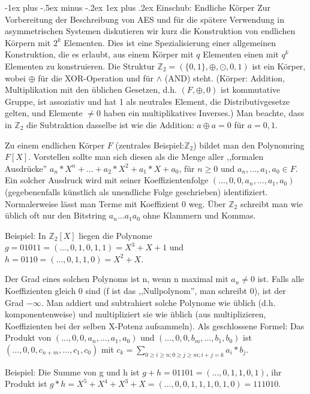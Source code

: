 \documentclass[a4paper]{article}
\makeatletter
\renewcommand{\subsubsection}{\@startsection{subsubsection}{3}{0mm}%
 {-1ex plus -.5ex minus -.2ex}%
 {1ex plus .2ex}%
 {\normalfont\small\bfseries}}
\makeatother
\begin{document}
\begin{multicols}{3}
    \subsubsection{Einschub: Endliche Körper}
    Zur Vorbereitung der Beschreibung von AES und für die spätere Verwendung in asymmetrischen Systemen diskutieren wir kurz die Konstruktion von endlichen Körpern mit $2^k$ Elementen. Dies ist eine Spezialisierung einer allgemeinen Konstruktion, die es erlaubt, aus einem Körper mit $q$ Elementen einen mit $q^k$ Elementen zu konstruieren.
    Die Struktur $\mathbb{Z}_2=(\{0,1\},\oplus,\odot, 0 ,1)$ ist ein Körper, wobei $\oplus$ für die XOR-Operation und für $\wedge$ (AND) steht. (Körper: Addition, Multiplikation mit den üblichen Gesetzen, d.h. $(F,\oplus ,0)$ ist kommutative Gruppe, ist assoziativ und hat 1 als neutrales Element, die Distributivgesetze gelten, und Elemente $\not=0$ haben ein multiplikatives Inverses.) Man beachte, dass in $\mathbb{Z}_2$ die Subtraktion dasselbe ist wie die Addition: $a\oplus a= 0$ für $a=0,1$.

    Zu einem endlichen Körper $F$ (zentrales Beispiel:$\mathbb{Z}_2$) bildet man den Polynomring $F[X]$. Vorstellen sollte man sich diesen als die Menge aller ,,formalen Ausdrücke'' $a_n* X^n+...+a_2 *X^2 +a_1 *X+a_0$, für $n\geq 0$ und $a_n,...,a_1,a_0\in F$. Ein solcher Ausdruck wird mit seiner Koeffizientenfolge $(...,0,0,a_n,...,a_1,a_0)$ (gegebenenfalls künstlich als unendliche Folge geschrieben) identifiziert. Normalerweise lässt man Terme mit Koeffizient 0 weg. Über $\mathbb{Z}_2$ schreibt man wie üblich oft nur den Bitstring $a_n...a_1a_0$ ohne Klammern und Kommas.

    Beispiel: In $\mathbb{Z}_2[X]$ liegen die Polynome $g=01011=(..., 0 , 1 , 0 , 1 ,1) =X^3 +X+1$ und $h=0110=(..., 0 , 1 , 1 ,0) =X^2 +X$.

    Der Grad eines solchen Polynoms ist n, wenn n maximal mit $a_n\not = 0$ ist. Falls alle Koeffizienten gleich 0 sind (f ist das ,,Nullpolynom'', man schreibt 0), ist der Grad $-\infty$. Man addiert und subtrahiert solche Polynome wie üblich (d.h. komponentenweise) und multipliziert sie wie üblich (aus multiplizieren, Koeffizienten bei der selben X-Potenz aufsammeln). Als geschlossene Formel: Das Produkt von $(...,0,0,a_n,...,a_1,a_0)$ und $(...,0,0,b_m,...,b_1,b_0)$ ist $(...,0,0,c_{n+m},...,c_1,c_0)$ mit $c_k=\sum_{0\geq i\geq n; 0\geq j\geq m; i+j=k} a_i*b_j$.

    Beispiel: Die Summe von g und h ist $g+h=01101=(...,0,1,1,0,1)$, ihr Produkt ist $g*h=X^5+X^4+X^3+X=(...,0,0,1,1,1,0,1,0)=111010$.


\end{multicols}
\end{document}
